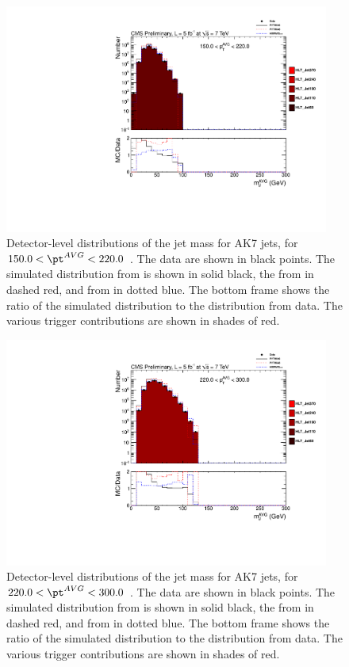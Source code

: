 \begin{figure}[htbp]
\centering
\includegraphics[width=0.95\textwidth]{figs/histAK7MjetVsPtAvg_rawDataMCComparisons_stacktrigs_pt_3}
\caption{Detector-level distributions of the jet mass for AK7 jets,
for $150.0 < \pt^{AVG} < 220.0$ \GeVc. The data are shown in black points.
The simulated distribution from \PYTHIA is shown in solid black, 
the from \PYTHIAEIGHT in dashed red, and from \HERWIG in dotted blue. 
The bottom frame shows the ratio of the simulated distribution
to the distribution from data. The various trigger contributions are shown in shades of red.
\label{figs:histAK7MjetVsPtAvg_rawDataMCComparisons_stacktrigs_pt_3}}
\end{figure}



\begin{figure}[htbp]
\centering
\includegraphics[width=0.95\textwidth]{figs/histAK7MjetVsPtAvg_rawDataMCComparisons_stacktrigs_pt_4}
\caption{Detector-level distributions of the jet mass for AK7 jets,
for $220.0 < \pt^{AVG} < 300.0$ \GeVc. The data are shown in black points.
The simulated distribution from \PYTHIA is shown in solid black, 
the from \PYTHIAEIGHT in dashed red, and from \HERWIG in dotted blue. 
The bottom frame shows the ratio of the simulated distribution
to the distribution from data. The various trigger contributions are shown in shades of red.
\label{figs:histAK7MjetVsPtAvg_rawDataMCComparisons_stacktrigs_pt_4}}
\end{figure}



